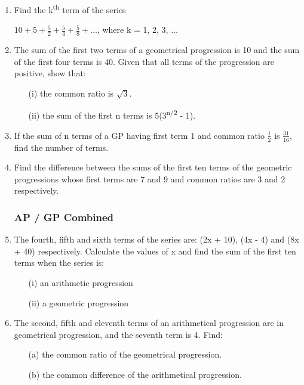 \begin{enumerate}
	\item Find the k\textsuperscript{th} term of the series
	\begin{center}
	$10 + 5 + \frac{5}{2} + \frac{5}{4} + \frac{5}{8} + \ldots$, where k = 1, 2, 3, $\ldots$
	\end{center}
	
	\item The sum of the first two terms of a geometrical progression is 10 and the sum of the first four terms is 40. Given that all terms of the progression are positive, show that:
	\begin{itemize}
	\item[(i)] the common ratio is $\sqrt{3}$.
	\item[(ii)] the sum of the first n terms is 5(3\textsuperscript{n/2} - 1).
	\end{itemize}

	\item If the sum of n terms of a GP having first term 1 and common ratio $\frac{1}{2}$ is $\frac{31}{16}$, find the number of terms.
	
	\item Find the difference between the sums of the first ten terms of the geometric progressions whose first terms are 7 and 9 and common ratios are 3 and 2 respectively.
	
			\subsubsection{AP / GP Combined}
			
	\item The fourth, fifth and sixth terms of the series are: (2x + 10), (4x - 4) and (8x + 40) respectively. Calculate the values of x and find the sum of the first ten terms when the series is:
	\begin{itemize}
	\item[(i)] an arithmetic progression
	\item[(ii)] a geometric progression
	\end{itemize}		

	\item The second, fifth and eleventh terms of an arithmetical progression are in geometrical progression, and the seventh term is 4. Find:
	\begin{itemize}
	\item[(a)] the common ratio of the geometrical progression.
	\item[(b)] the common difference of the arithmetical progression.
	\end{itemize}
	

\end{enumerate}
